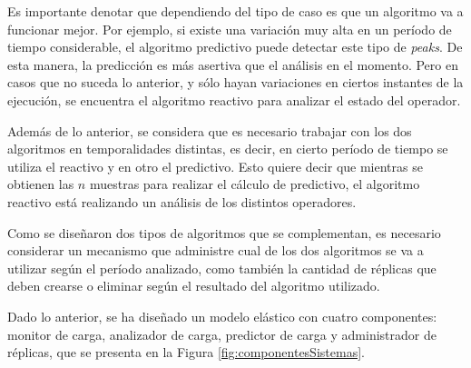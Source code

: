 Es importante denotar que dependiendo del tipo de caso es que un algoritmo va a funcionar mejor. Por ejemplo, si existe una variación muy alta en un período de tiempo considerable, el algoritmo predictivo puede detectar este tipo de \textit{peaks}. De esta manera, la predicción es más asertiva que el análisis en el momento. Pero en casos que no suceda lo anterior, y sólo hayan variaciones en ciertos instantes de la ejecución, se encuentra el algoritmo reactivo para analizar el estado del operador.

Además de lo anterior, se considera que es necesario trabajar con los dos algoritmos en temporalidades distintas, es decir, en cierto período de tiempo se utiliza el reactivo y en otro el predictivo. Esto quiere decir que mientras se obtienen las $n$ muestras para realizar el cálculo de predictivo, el algoritmo reactivo está realizando un análisis de los distintos operadores.


Como se diseñaron dos tipos de algoritmos que se complementan, es necesario considerar un mecanismo que administre cual de los dos algoritmos se va a utilizar según el período analizado, como también la cantidad de réplicas que deben crearse o eliminar según el resultado del algoritmo utilizado.

Dado lo anterior, se ha diseñado un modelo elástico con cuatro componentes: monitor de carga, analizador de carga, predictor de carga y administrador de réplicas, que se presenta en la Figura \ref{fig:componentesSistemas}.

